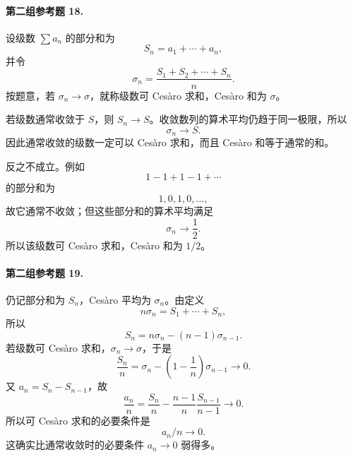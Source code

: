 \paragraph{第二组参考题 18.}
\begin{xsolution}
设级数 $\sum a_n$ 的部分和为
\[
 S_n=a_1+\cdots+a_n,
\]
并令
\[
 \sigma_n=\frac{S_1+S_2+\cdots+S_n}{n}.
\]
按题意，若 $\sigma_n\to\sigma$，就称级数可 Cesàro 求和，Cesàro 和为 $\sigma$。

若级数通常收敛于 $S$，则 $S_n\to S$。收敛数列的算术平均仍趋于同一极限，所以
\[
 \sigma_n\to S.
\]
因此通常收敛的级数一定可以 Cesàro 求和，而且 Cesàro 和等于通常的和。

反之不成立。例如
\[
 1-1+1-1+\cdots
\]
的部分和为
\[
 1,0,1,0,\ldots,
\]
故它通常不收敛；但这些部分和的算术平均满足
\[
 \sigma_n\longrightarrow\frac12.
\]
所以该级数可 Cesàro 求和，Cesàro 和为 $1/2$。
\end{xsolution}

\paragraph{第二组参考题 19.}
\begin{xsolution}
仍记部分和为 $S_n$，Cesàro 平均为 $\sigma_n$。由定义
\[
 n\sigma_n=S_1+\cdots+S_n,
\]
所以
\[
 S_n=n\sigma_n-(n-1)\sigma_{n-1}.
\]
若级数可 Cesàro 求和，$\sigma_n\to\sigma$，于是
\[
 \frac{S_n}{n}
 =\sigma_n-\left(1-\frac1n\right)\sigma_{n-1}\longrightarrow0.
\]
又 $a_n=S_n-S_{n-1}$，故
\[
 \frac{a_n}{n}
 =\frac{S_n}{n}-\frac{n-1}{n}\frac{S_{n-1}}{n-1}\longrightarrow0.
\]
所以可 Cesàro 求和的必要条件是
\[
 \boxed{a_n/n\to0}.
\]
这确实比通常收敛时的必要条件 $a_n\to0$ 弱得多。
\end{xsolution}

